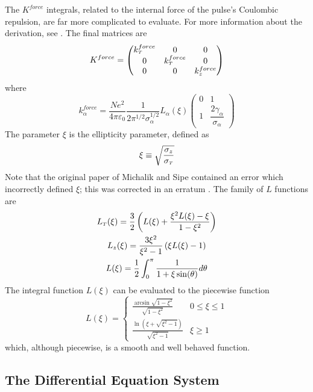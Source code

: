 The $K^{force}$ integrals, related to the internal force of the pulse's Coulombic repulsion, are far more complicated to evaluate.
For more information about the derivation, see \cite{michalik_analytic_2006}.
The final matrices are
\begin{equation}
  K^{force} = 
  \begin{pmatrix}
    k^{force}_{{\scriptscriptstyle T}} & 0 & 0 \\
    0 & k^{force}_{{\scriptscriptstyle T}} & 0 \\
    0 & 0 & k^{force}_{z}
  \end{pmatrix}
\end{equation}
where
\begin{equation}
  k^{force}_{\alpha} = 
  \frac{N e^2}{4\pi\varepsilon_0} \frac{1}{2\pi^{1/2}\sigma_{\alpha}^{1/2}} L_{\alpha}(\xi)
  \begin{pmatrix}
    0 & 1 \\
    1 & \dfrac{2 \gamma_{\alpha}}{\sigma_{\alpha}}
  \end{pmatrix}
\end{equation}
The parameter $\xi$ is the ellipticity parameter, defined as
\begin{equation}
  \xi \equiv \sqrt{\dfrac{\sigma_{z}}{\sigma_{{\scriptscriptstyle T}}}}
\end{equation}
Note that the original paper of Michalik and Sipe contained an error which incorrectly defined $\xi$; this was corrected in an erratum \cite{michalik_erratum:_2008}.
The family of $L$ functions are
\begin{gather}
  L_{{\scriptscriptstyle T}}(\xi) = \frac{3}{2} \left( L(\xi) + \frac{\xi^2 L(\xi) - \xi}{ 1 - \xi^2 } \right) \\
  L_{z}(\xi) = \frac{ 3 \xi^2 }{ \xi^2 - 1} \left( \xi L(\xi) - 1 \right) \\
  L(\xi) = \frac{1}{2} \int_0^{\pi} \frac{1}{1+\xi\sin(\theta)} d\theta
\end{gather}
The integral function $L(\xi)$ can be evaluated to the piecewise function
\begin{equation}
  L(\xi) = 
  \begin{cases}
    \frac{ \arcsin \sqrt{1-\xi^2} }{ \sqrt{1-\xi^2} } & 0 \le \xi \le 1 \\
    \frac{ \ln\left( \xi + \sqrt{\xi^2 - 1} \right) }{ \sqrt{\xi^2 - 1} } & \xi \ge 1
  \end{cases}
\end{equation}
which, although piecewise, is a smooth and well behaved function.

\subsection{The Differential Equation System}

